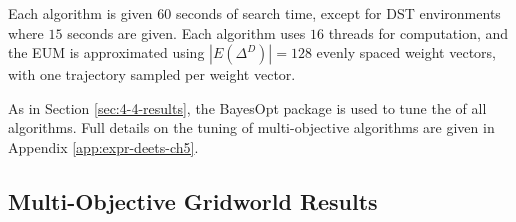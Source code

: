     Each algorithm is given $60$ seconds of search time, except for DST environments where $15$ seconds are given. Each algorithm uses $16$ threads for computation, and the EUM is approximated using $|E(\Delta^D)| = 128$ evenly spaced weight vectors, with one trajectory sampled per weight vector.

    As in Section \ref{sec:4-4-results}, the BayesOpt package \cite{bayesopt} is used to tune the  of all algorithms. Full details on the  tuning of multi-objective algorithms are given in Appendix \ref{app:expr-deets-ch5}.




\subsection{Multi-Objective Gridworld Results}
\label{sec:5-5-3-results_and_discussion}

